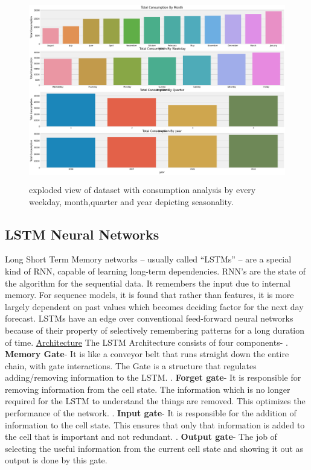 \documentclass[12 pt]{report}
\begin{document}
\begin{figure}[h!]
  \centering
  \includegraphics[width=12cm,height = 8cm,frame]{images/eda3.png}
  \caption{exploded view of dataset with consumption analysis by every weekday, month,quarter and year depicting seasonality.}
  \label{fig:Usage bargraph}
  \end{figure}

\newpage

\subsection{LSTM Neural Networks}

    Long Short Term Memory networks – usually called “LSTMs” – are a special kind of RNN, capable of learning long-term dependencies. RNN's are the state of the algorithm for the sequential data. It remembers the input due to internal memory.
\newline For sequence models, it is found that rather than features, it is more largely dependent on past values which becomes deciding factor for the next day forecast. LSTMs have an edge over conventional feed-forward neural networks because of their property of selectively remembering patterns for a long duration of time.
\newline
\newline
\underline{Architecture}
\newline
The LSTM Architecture consists of four components-
. \textbf{Memory Gate}- It is like a conveyor belt that runs straight down the entire chain, with gate interactions. The Gate is a structure that regulates adding/removing information to the LSTM.
. \textbf{Forget gate}- It is responsible for removing information from the cell state. The information which is no longer required for the LSTM to understand the  things are removed. This optimizes the performance of the network.
. \textbf{Input gate}- It is responsible for the addition of information to the cell state. This ensures that only that information is added to the cell that is important and not redundant.
. \textbf{Output gate}- The job of selecting the useful information from the current cell state and showing it out as output is done by this gate.
\newline
\end{document}

